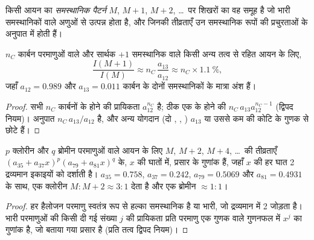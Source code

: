 \begin{definition}[समस्थानिक पैटर्न]\label{def:b2:mass-spec-atomic:isotope-pattern}
किसी आयन का \emph{समस्थानिक पैटर्न} $M$, $M+1$,
$M+2$, \dots\ पर शिखरों का वह समूह है जो भारी समस्थानिकों वाले अणुओं से उत्पन्न होता है, और जिनकी तीव्रताएँ
उन समस्थानिक रूपों की प्रचुरताओं के अनुपात में होती हैं।
\end{definition}

\begin{proposition}[$M+1$ शिखर]\label{prop:b2:mass-spec-atomic:m-plus-one}
$n_C$ कार्बन परमाणुओं वाले और सार्थक $+1$ समस्थानिक वाले किसी अन्य तत्व से रहित आयन के लिए,
\begin{equation*}
\frac{I(M+1)}{I(M)} \approx n_C\,\frac{a_{13}}{a_{12}} \approx n_C \times 1.1~\%,
\end{equation*}
जहाँ $a_{12} = 0.989$ और $a_{13} = 0.011$ कार्बन के दोनों समस्थानिकों के मात्रा अंश हैं।
\end{proposition}

\begin{proof}
सभी $n_C$ कार्बनों के  होने की प्रायिकता $a_{12}^{n_C}$ है; ठीक एक के
 होने की $n_C\,a_{13}a_{12}^{n_C - 1}$ (द्विपद नियम)। अनुपात $n_C\,a_{13}/a_{12}$ है, और
अन्य योगदान (दो , , ) $a_{13}$ या उससे कम की कोटि के गुणक से
छोटे हैं।
\end{proof}

\begin{proposition}[क्लोरीन और ब्रोमीन]\label{prop:b2:mass-spec-atomic:halogen-patterns}
$p$ क्लोरीन और $q$ ब्रोमीन परमाणुओं वाले आयन के लिए $M$, $M+2$, $M+4$, \dots\ की तीव्रताएँ
$(a_{35} + a_{37}x)^p(a_{79} + a_{81}x)^q$ के, $x$ की घातों में, प्रसार के गुणांक हैं, जहाँ $x$ की हर
घात 2 द्रव्यमान इकाइयों को दर्शाती है। $a_{35} = 0.758$, $a_{37} = 0.242$, $a_{79} = 0.5069$ और
$a_{81} = 0.4931$ के साथ, एक क्लोरीन $M : M+2 \approx 3 : 1$ देता है और एक ब्रोमीन $\approx 1 : 1$।
\end{proposition}

\begin{proof}
हर हैलोजन परमाणु स्वतंत्र रूप से हल्का समस्थानिक है या भारी, जो द्रव्यमान में 2 जोड़ता है। भारी परमाणुओं की
किसी दी गई संख्या $j$ की प्रायिकता प्रति परमाणु एक गुणक वाले गुणनफल में $x^j$ का गुणांक है,
जो बताया गया प्रसार है (प्रति तत्व द्विपद नियम)।
\end{proof}

